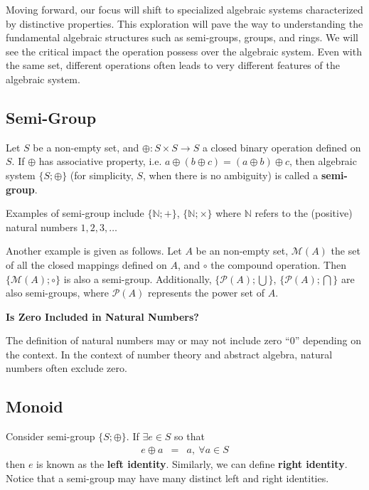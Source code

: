 Moving forward, our focus will shift to specialized algebraic systems characterized by distinctive properties. This exploration will pave the way to understanding the fundamental algebraic structures such as semi-groups, groups, and rings. We will see the critical impact the operation possess over the algebraic system. Even with the same set, different operations often leads to very different features of the algebraic system.

\subsection{Semi-Group}

Let $S$ be a non-empty set, and $\oplus: S\times S \rightarrow S$ a closed binary operation defined on $S$. If $\oplus$ has associative property, i.e. $a\oplus(b\oplus c) = (a \oplus b) \oplus c$, then algebraic system $\{S; \oplus\}$ (for simplicity, $S$, when there is no ambiguity) is called a \textbf{semi-group}.

Examples of semi-group include $\{\mathbb{N}; +\}$, $\{\mathbb{N}; \times\}$ where $\mathbb{N}$ refers to the (positive) natural numbers $1, 2, 3, \ldots$ 

Another example is given as follows. Let $A$ be an non-empty set, $\mathcal{M}(A)$ the set of all the closed mappings defined on $A$, and $\circ$ the compound operation. Then $\{\mathcal{M}(A); \circ\}$ is also a semi-group. Additionally, $\{\mathcal{P}(A); \bigcup\}$, $\{\mathcal{P}(A); \bigcap\}$ are also semi-groups, where $\mathcal{P}(A)$ represents the power set of $A$.

\begin{mdframed}
\noindent \textbf{Is Zero Included in Natural Numbers?}

The definition of natural numbers may or may not include zero ``$0$'' depending on the context. In the context of number theory and abstract algebra, natural numbers often exclude zero.
\end{mdframed}

\subsection{Monoid}

Consider semi-group $\{S; \oplus\}$. If $\exists e\in S$ so that
\begin{eqnarray}
	e\oplus a &=& a, ~\forall a \in S \nonumber
\end{eqnarray}
then $e$ is known as the \textbf{left identity}. Similarly, we can define \textbf{right identity}. Notice that a semi-group may have many distinct left and right identities.

